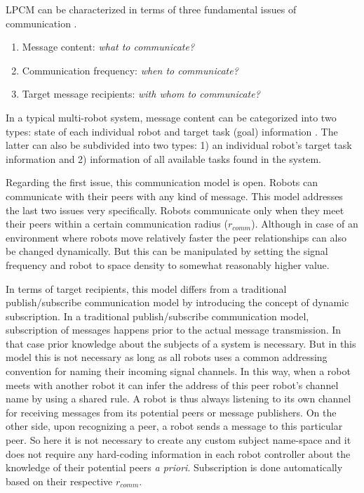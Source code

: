 LPCM can be  characterized  in terms of three fundamental issues of communication \cite{Gerkey+2001}. 
\begin{enumerate}
\item Message content: {\em what to communicate?}
\item Communication frequency: {\em when to communicate?}
\item Target message recipients: {\em with whom to communicate?}
\end{enumerate}
In a typical multi-robot system, message content can be categorized into two types: state of each individual robot and target task (goal) information \cite{Balch2005}. The latter can also be subdivided into two types: 1) an individual robot's target task information and 2) information of all available tasks found in the system.

Regarding the first issue, this communication model is open. Robots can communicate with their peers with any kind of message. This model addresses the last two issues very specifically. Robots communicate only when they meet their peers within a certain communication radius ($r_{comm}$). Although in case of an environment where robots move relatively faster the peer relationships can also be changed dynamically. But this can be manipulated by setting the signal frequency and robot to space density to somewhat reasonably higher value.

In terms of target recipients, this model differs from a traditional publish/subscribe communication model by introducing the concept of dynamic subscription. In a traditional publish/subscribe communication model, subscription of messages happens prior to the actual message transmission. In that case prior knowledge about the subjects of a system is necessary. But in this model this is not necessary as long as all robots uses a common addressing convention for naming their incoming signal channels. In this way, when a robot meets with another robot it can infer the address of this peer robot's channel name by using a shared rule. A robot is thus always listening to its own channel for receiving messages from its potential peers or message publishers. On the other side, upon recognizing a peer, a robot sends a message to this particular peer. So here it is not necessary to create any custom subject name-space  \cite{Gerkey+2001} and it does  not require  any hard-coding information in each robot controller about the knowledge of their potential peers {\em a priori}. Subscription is done automatically based on their respective $r_{comm}$.
%
